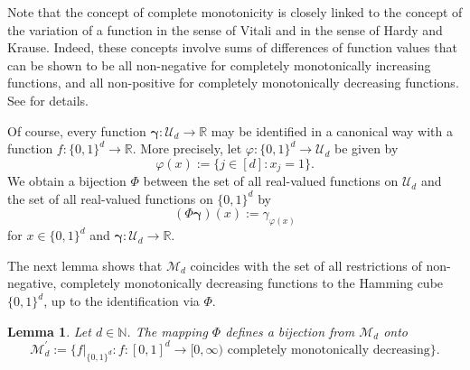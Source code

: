 \documentclass{article}
\newcommand{\R}  {{\mathbb R}}
\newcommand{\N}  {{\mathbb N}}
\newcommand{\bg}{{\boldsymbol{\gamma}}}
\newcommand{\U}  {\mathcal{U}}
\newcommand{\M}  {\mathcal{M}}
\theoremstyle{plain}
\newtheorem{lemma}{Lemma}
\theoremstyle{definition}
\begin{document}
Note that the concept of complete monotonicity 
is closely linked to the concept of
the variation of a function in the 
sense of Vitali and in the sense of Hardy and Krause. Indeed, 
these concepts involve sums of differences 
of function values that can be shown to be all non-negative for 
completely monotonically increasing functions, and all non-positive 
for completely monotonically decreasing functions.
See \cite{AD2015} for details.

Of course, every 
function $\bg \colon \U_d \to \R$
may be identified in a canonical way with a 
function $f \colon \{0,1\}^d \to \R$.
More precisely, let $\varphi \colon \{0,1\}^d \to \U_d$ be given by 
\[
\varphi(x) := \{ j \in [d] : x_j = 1\}.
\]
We obtain a bijection $\Phi$ between 
the set of all real-valued functions on $\U_d$
and the set of all real-valued functions on $\{0,1\}^d$
by
\[
(\Phi \bg) (x) := \gamma_{\varphi(x)}
\]
for $x \in \{0,1\}^d$ and 
$\bg \colon \U_d \to \R$. 

The next lemma shows that
$\M_d$ coincides with the set of all restrictions of non-negative,
completely monotonically decreasing functions 
to the Hamming cube $\{0,1\}^d$,
up to the identification via $\Phi$.

\begin{lemma}\label{Lemma33}
Let $d\in \N$.
The mapping $\Phi$ defines a bijection from $\M_d$ onto 
\[
\M_d^\prime := \{ f|_{\{0,1\}^d} : 
\text{$f \colon [0,1]^d \to {[0,\infty)}$ completely monotonically
decreasing}\}. 
\]
\end{lemma}
\end{document}
